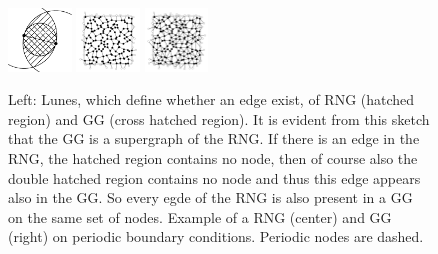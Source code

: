     \begin{figure}[htbp]
        \centering
        \includegraphics[width=0.15\textwidth]{images/GG_RNG_def}
        \includegraphics[width=0.15\textwidth]{images/RNG/L12S03.pdf}
        \includegraphics[width=0.15\textwidth]{images/GG/L12S03.pdf}
        \caption[Gabriel- and Relative Neighborhood Graph]
        {
            Left: Lunes, which define whether an edge
            exist, of RNG (hatched region) and GG (cross hatched region).
            It is evident from this sketch that the GG is a supergraph
            of the RNG. If there is an edge in the RNG, the hatched
            region contains no node, then of course also the double
            hatched region contains no node and thus this edge appears
            also in the GG. So every egde of the RNG is also present
            in a GG on the same set of nodes.
            Example of a RNG (center) and GG (right) on periodic boundary conditions.
            Periodic nodes are dashed.
        }
        \label{fig:lunes}
    \end{figure}

